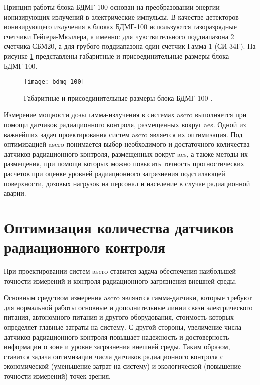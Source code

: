 Принцип работы блока БДМГ-100 основан на преобразовании энергии ионизирующих излучений в электрические импульсы. В 
качестве детекторов ионизирующего излучения в блоках БДМГ-100 используются газоразрядные счетчики Гейгера-Мюллера, а 
именно: для чувствительного поддиапазона 2 счетчика СБМ20, а для грубого поддиапазона один счетчик Гамма-1 (СИ-34Г). На 
рисунке \ref{fig_bdmg_100} представлены габаритные и присоединительные размеры блока БДМГ-100.

\begin{figure}[ht!]
    \centering
    \texttt{[image: bdmg-100]}
    \captionsetup{justification=centering}
    \caption{Габаритные и присоединительные размеры блока БДМГ-100 \cite{bdmg-100}.}
    \label{fig_bdmg_100}
\end{figure}

Измерение мощности дозы гамма-излучения в системах \ac{ascro} выполняется при помощи датчиков радиационного контроля, 
размещенных вокруг \ac{aes}. Одной из важнейших задач проектирования систем \ac{ascro} является их оптимизация. Под 
оптимизацией \ac{ascro} понимается выбор необходимого и достаточного количества датчиков радиационного контроля, 
размещенных вокруг \ac{aes}, а также методы их размещения, при помощи которых можно повысить точность прогностических 
расчетов при оценке уровней радиационного загрязнения подстилающей поверхности, дозовых нагрузок на персонал и население 
в случае радиационной аварии.

\section{Оптимизация количества датчиков радиационного контроля}

При проектировании систем \ac{ascro} ставится задача обеспечения наибольшей точности измерений и контроля радиационного 
загрязнения внешней среды. 

Основным средством измерения \ac{ascro} являются гамма-датчики, которые требуют для нормальной работы основные и 
дополнительные линии связи электрического питания, автономного питания и другого оборудования, стоимость которых 
определяет главные затраты на систему. С другой стороны, увеличение числа датчиков радиационного контроля повышает 
надежность и достоверность информации о зоне и уровне загрязнения внешней среды. Таким образом, ставится задача 
оптимизации числа датчиков радиационного контроля с экономической (уменьшение затрат на систему) и экологической 
(повышение точности измерений) точек зрения.


